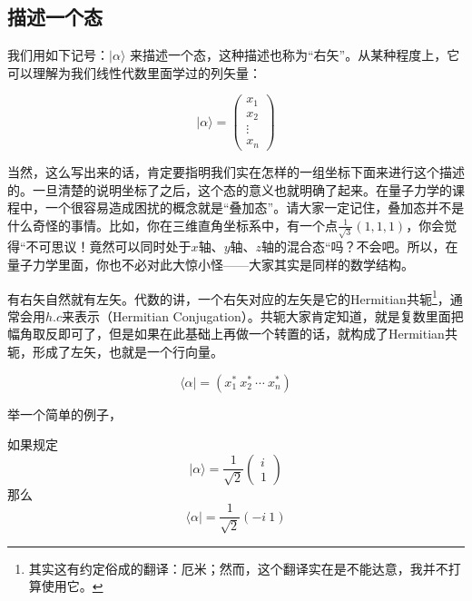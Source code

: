 
\subsection{描述一个态}

我们用如下记号：$|\alpha\rangle$ 来描述一个态，这种描述也称为“右矢”。从某种程度上，它可以理解为我们线性代数里面学过的列矢量：

\begin{equation}
|\alpha\rangle = \left(\begin{matrix}x_1\\x_2\\ \vdots\\ x_n\end{matrix}\right)
\end{equation}

当然，这么写出来的话，肯定要指明我们实在怎样的一组坐标下面来进行这个描述的。一旦清楚的说明坐标了之后，这个态的意义也就明确了起来。在量子力学的课程中，一个很容易造成困扰的概念就是“叠加态”。请大家一定记住，叠加态并不是什么奇怪的事情。比如，你在三维直角坐标系中，有一个点$\displaystyle\frac{1}{\sqrt{3}}(1, 1, 1)$，你会觉得“不可思议！竟然可以同时处于$x$轴、$y$轴、$z$轴的混合态“吗？不会吧。所以，在量子力学里面，你也不必对此大惊小怪——大家其实是同样的数学结构。

有右矢自然就有左矢。代数的讲，一个右矢对应的左矢是它的Hermitian共轭\footnote{其实这有约定俗成的翻译：厄米；然而，这个翻译实在是不能达意，我并不打算使用它。}，通常会用$h. c$来表示（Hermitian Conjugation）。共轭大家肯定知道，就是复数里面把幅角取反即可了，但是如果在此基础上再做一个转置的话，就构成了Hermitian共轭，形成了左矢，也就是一个行向量。

\begin{equation}
\langle\alpha| = (x_1^*\ x_2^*\ \cdots\ x_n^*)
\end{equation}

举一个简单的例子，

\begin{exam}{}
如果规定
\begin{equation}
|\alpha\rangle = \frac{1}{\sqrt{2}}\left(\begin{matrix}i\\1\end{matrix}\right) 
\end{equation}
那么
\begin{equation}
\langle\alpha| = \frac{1}{\sqrt{2}}(-i\ 1)
\end{equation}
\end{exam}

